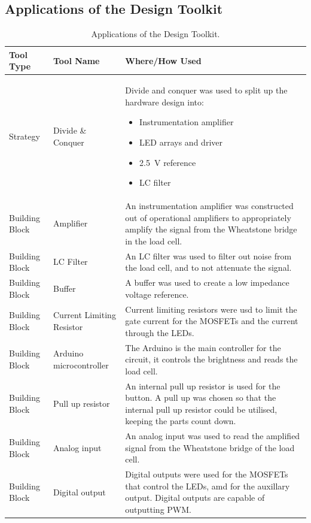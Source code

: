 \documentclass[twoside]{article}
\begin{document}
\newpage
\begin{appendices}
    \section{Applications of the Design Toolkit}
        \begin{table}[h]
            \centering
            \caption{Applications of the Design Toolkit.} \label{table:designtoolkit}
            \begin{tabularx}{\linewidth}{l l X}
                \toprule
                Tool Type & Tool Name & Where/How Used \\
                \midrule
                Strategy & Divide \& Conquer & Divide and conquer was used to split up the hardware design into:
                \begin{itemize}
                    \item Instrumentation amplifier
                    \item LED arrays and driver
                    \item \SI{2.5}{\volt} reference
                    \item LC filter
                \end{itemize}  \\
                Building Block & Amplifier & An instrumentation amplifier was constructed out of operational amplifiers to appropriately amplify the signal from the Wheatstone bridge in the load cell. \\
                Building Block & LC Filter & An LC filter was used to filter out noise from the load cell, and to not attenuate the signal. \\
                Building Block & Buffer & A buffer was used to create a low impedance voltage reference. \\
                Building Block & Current Limiting Resistor & Current limiting resistors were usd to limit the gate current for the MOSFETs and the current through the LEDs. \\
                Building Block & Arduino microcontroller & The Arduino is the main controller for the circuit, it controls the brightness and reads the load cell. \\
                Building Block & Pull up resistor & An internal pull up resistor is used for the button. A pull up was chosen so that the internal pull up resistor could be utilised, keeping the parts count down.\\
                Building Block & Analog input & An analog input was used to read the amplified signal from the Wheatstone bridge of the load cell. \\
                Building Block & Digital output & Digital outputs were used for the MOSFETs that control the LEDs, amd for the auxillary output. Digital outputs are capable of outputting PWM. \\
                \bottomrule
            \end{tabularx}
        \end{table}
    \newpage

\end{appendices}
\end{document}
